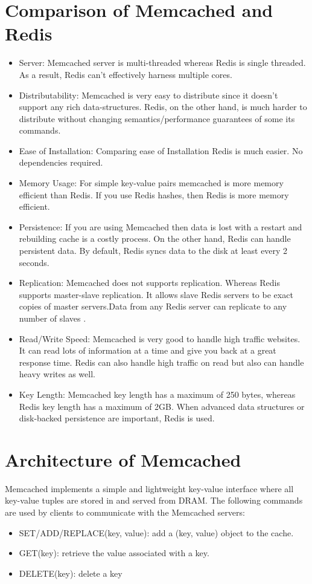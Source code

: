\documentclass[9pt,twocolumn,twoside]{../../styles/osajnl}
\begin{document}
\section{Comparison of Memcached and Redis}
\begin{itemize}
  \item Server: Memcached server is multi-threaded whereas Redis is
    single threaded.  As a result, Redis \cite{www-redis-wikipedia}
    can't effectively harness multiple cores.
  \item Distributability: Memcached is very easy to distribute since
    it doesn't support any rich data-structures.  Redis, on the other
    hand, is much harder to distribute without changing
    semantics/performance guarantees of some its commands.
  \item Ease of Installation: Comparing ease of Installation Redis is
    much easier. No dependencies required.
  \item Memory Usage: For simple key-value pairs memcached is more
    memory efficient than Redis.  If you use Redis hashes, then Redis
    is more memory efficient.
  \item Persistence: If you are using Memcached then data is lost with
    a restart and rebuilding cache is a costly process.  On the other
    hand, Redis can handle persistent data. By default, Redis syncs
    data to the disk at least every 2 seconds.
  \item Replication: Memcached does not supports replication.  Whereas
    Redis supports master-slave replication. It allows slave Redis
    servers to be exact copies of master servers.Data from any Redis
    server can replicate to any number of slaves
    \cite{www-memcached-comparison}.
  \item Read/Write Speed: Memcached is very good to handle high
    traffic websites. It can read lots of information at a time and
    give you back at a great response time. Redis can also handle high
    traffic on read but also can handle heavy writes as well.
  \item Key Length: Memcached key length has a maximum of 250 bytes,
    whereas Redis key length has a maximum of 2GB.  When advanced data
    structures or disk-backed persistence are important, Redis is used.
\end{itemize}

\section{Architecture of Memcached}
Memcached implements a simple and lightweight key-value interface
where all key-value tuples are stored in and served from DRAM. The
following commands are used by clients to communicate with the
Memcached servers:
\begin{itemize}
  \item SET/ADD/REPLACE(key, value): add a (key, value) object to the
    cache.
  \item GET(key): retrieve the value associated with a key.
  \item DELETE(key): delete a key
\end{itemize}
\end{document}

